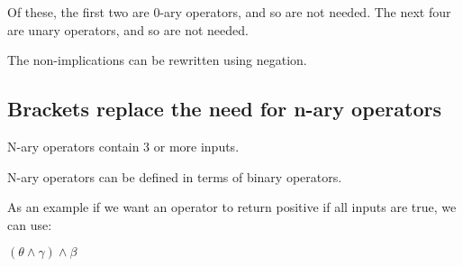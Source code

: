 Of these, the first two are \(0\)-ary operators, and so are not needed. The next four are unary operators, and so are not needed.

The non-implications can be rewritten using negation.

\subsection{Brackets replace the need for n-ary operators}

N-ary operators contain \(3\) or more inputs.

N-ary operators can be defined in terms of binary operators.

As an example if we want an operator to return positive if all inputs are true, we can use:

$(\theta \land \gamma )\land \beta $

